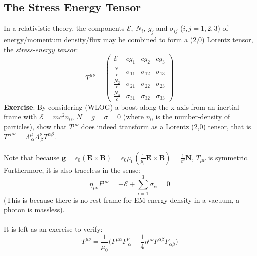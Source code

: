 \documentclass[a4paper]{article}
\numberwithin{equation}{section}
\begin{document}
\subsection{The Stress Energy Tensor}
In a relativistic theory, the components $\mathcal{E}, \ N_i, \ g_j$ and $\sigma_{ij}$ ($i,j=1,2,3$) of energy/momentum density/flux may be combined to form a (2,0) Lorentz tensor, the \textit{stress-energy tensor}:
\begin{equation}
T^{\mu \nu} = 
\begin{pmatrix}
\mathcal{E} & cg_1 & cg_2 & cg_3 \\[1pt]
\frac{N_1}{c} & \sigma_{11} & \sigma_{12} & \sigma_{13} \\[4pt]
\frac{N_2}{c} & \sigma_{21} & \sigma_{22} & \sigma_{23} \\[4pt]
\frac{N_3}{c} & \sigma_{31} & \sigma_{32} & \sigma_{33} 
\end{pmatrix}
\end{equation}
\textbf{Exercise}: By considering (WLOG) a boost along the x-axis from an inertial frame with $\mathcal{E}=mc^2n_0$, $N=g=\sigma=0$ (where $n_0$ is the number-density of particles), show that $T^{\mu\nu}$ does indeed transform as a Lorentz (2,0) tensor, that is $T'^{\mu\nu}=\Lambda^\mu_{\ \alpha} \Lambda^\nu_{\ \beta}T^{\alpha \beta}$.\\
\\
Note that because $\mathbf{g}=\epsilon_0(\mathbf{E}\times \mathbf{B})=\epsilon_0\mu_0(\frac{1}{\mu_0}\mathbf{E}\times \mathbf{B})=\frac{1}{c^2}\mathbf{N}$, $T_{\mu\nu}$ is symmetric. Furthermore, it is also traceless in the sense:
\begin{equation}
\eta_{\mu \nu}F^{\mu \nu}=-\mathcal{E}+\sum_{i=1}^{3}\sigma_{ii} = 0 
\end{equation}
(This is because there is no rest frame for EM energy density in a vacuum, a photon is massless).\\
\\
It is left as an exercise to verify:
\begin{equation}
T^{\mu \nu}=\frac{1}{\mu_0}\big(F^{\mu\alpha}F^\nu_{ \ \alpha} - \frac{1}{4}\eta^{\mu \nu}F^{\alpha \beta}F_{\alpha \beta} \big)
\end{equation}
\end{document}

